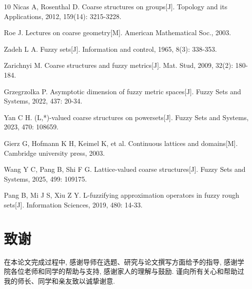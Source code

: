 \documentclass[12pt,oneside,openany,fontset=windows]{ctexbook}
\numberwithin{equation}{section}
\begin{document}
\clearpage
\begin{thebibliography}{10}
\small\vspace*{3.2pt}
\linespread{0}\selectfont
\addtolength{\itemsep}{-1.0ex}
Nicas A, Rosenthal D. Coarse structures on groups[J]. Topology and its Applications, 2012, 159(14): 3215-3228.

Roe J. Lectures on coarse geometry[M]. American Mathematical Soc., 2003.

Zadeh L A. Fuzzy sets[J]. Information and control, 1965, 8(3): 338-353.

Zarichnyi M. Coarse structures and fuzzy metrics[J]. Mat. Stud, 2009, 32(2): 180-184.

Grzegrzolka P. Asymptotic dimension of fuzzy metric spaces[J]. Fuzzy Sets and Systems, 2022, 437: 20-34.

Yan C H. (L,*)-valued coarse structures on powersets[J]. Fuzzy Sets and Systems, 2023, 470: 108659.

Gierz G, Hofmann K H, Keimel K, et al. Continuous lattices and domains[M]. Cambridge university press, 2003.

Wang Y C, Pang B, Shi F G. Lattice-valued coarse structures[J]. Fuzzy Sets and Systems, 2025, 499: 109175.

Pang B, Mi J S, Xiu Z Y. L-fuzzifying approximation operators in fuzzy rough sets[J]. Information Sciences, 2019, 480: 14-33.

\end{thebibliography}

\newpage
\chapter*{致谢}
在本论文完成过程中, 感谢导师在选题、研究与论文撰写方面给予的指导, 感谢学院各位老师和同学的帮助与支持, 感谢家人的理解与鼓励. 谨向所有关心和帮助过我的师长、同学和亲友致以诚挚谢意.

\newpage
\end{document}
